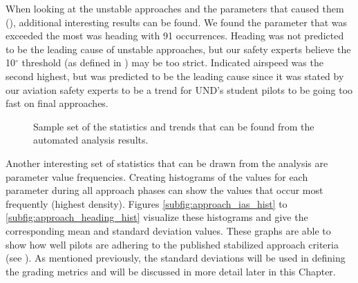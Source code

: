         When looking at the unstable approaches and the parameters that caused them (), additional interesting results can be found.  We found the parameter that was exceeded the most was heading with 91 occurrences.  Heading was not predicted to be the leading cause of unstable approaches, but our safety experts believe the 10$^\circ$ threshold (as defined in ) may be too strict.  Indicated airspeed was the second highest, but was predicted to be the leading cause since it was stated by our aviation safety experts to be a trend for UND's student pilots to be going too fast on final approaches.
    
        \begin{figure}
        	\centering
            \hfill%
        
            \hfill%
            \caption{Sample set of the statistics and trends that can be found from the automated analysis results.}
            \label{fig:example_statistics}
        \end{figure}
    
    
        Another interesting set of statistics that can be drawn from the analysis are parameter value frequencies.  Creating histograms of the values for each parameter during all approach phases can show the values that occur most frequently (highest density).  Figures \ref{subfig:approach_ias_hist} to \ref{subfig:approach_heading_hist} visualize these histograms and give the corresponding mean and standard deviation values.  These graphs are able to show how well pilots are adhering to the published stabilized approach criteria (see ).  As mentioned previously, the standard deviations will be used in defining the grading metrics and will be discussed in more detail later in this Chapter.
    

